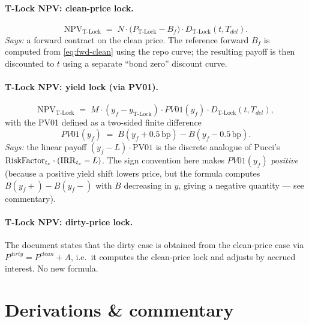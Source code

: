 \documentclass[11pt,a4paper]{article}
\begin{document}
\paragraph{T-Lock NPV: clean-price lock.}
\begin{equation}\label{eq:npv-clean}
  \mathrm{NPV}_{\text{T-Lock}} \;=\; N \cdot \bigl(P_{\text{T-Lock}} - B_f\bigr) \cdot D_{\text{T-Lock}}(t, T_{del}).
\end{equation}
\textit{Says:} a forward contract on the clean price. The reference
forward $B_f$ is computed from \eqref{eq:fwd-clean} using the repo
curve; the resulting payoff is then discounted to $t$ using a separate
``bond zero'' discount curve.

\paragraph{T-Lock NPV: yield lock (via PV01).}
\begin{equation}\label{eq:npv-yield}
  \mathrm{NPV}_{\text{T-Lock}} \;=\; M \cdot (y_f - y_{\text{T-Lock}}) \cdot PV01(y_f) \cdot D_{\text{T-Lock}}(t, T_{del}),
\end{equation}
with the PV01 defined as a two-sided finite difference
\begin{equation}\label{eq:pv01-fd}
  PV01(y_f) \;=\; B(y_f + 0.5\,\text{bp}) - B(y_f - 0.5\,\text{bp}).
\end{equation}
\textit{Says:} the linear payoff $(y_f - L) \cdot \text{PV01}$ is the
discrete analogue of Pucci's $\mathrm{RiskFactor}_{t_e} \cdot (\mathrm{IRR}_{t_e} - L)$.
The sign convention here makes $PV01(y_f)$ \emph{positive} (because a
positive yield shift lowers price, but the formula computes
$B(y_f+) - B(y_f-)$ with $B$ decreasing in $y$, giving a negative
quantity --- see commentary).

\paragraph{T-Lock NPV: dirty-price lock.}
The document states that the dirty case is obtained from the
clean-price case via $P^{dirty} = P^{clean} + A$, i.e.\ it computes the
clean-price lock and adjusts by accrued interest. No new formula.

\section{Derivations \& commentary}
\end{document}
